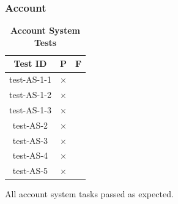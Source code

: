 \documentclass[12pt, titlepage]{article}
\begin{document}



\subsubsection{Account}

\begin{table}[H]
\centering
\begin{tabular}{|c|c|c|}
\hline
Test ID & P & F\\
\hline 
test-AS-1-1 & $\times$ & \\
test-AS-1-2 & $\times$ & \\
test-AS-1-3 & $\times$ & \\
test-AS-2 & $\times$ & \\
test-AS-3 & $\times$ & \\
test-AS-4 & $\times$ & \\
test-AS-5 & $\times$ & \\
\hline
\end{tabular}
\caption{\bf Account System Tests}
\end{table}

All account system tasks passed as expected.



					
					


					

					
					
\end{document}
